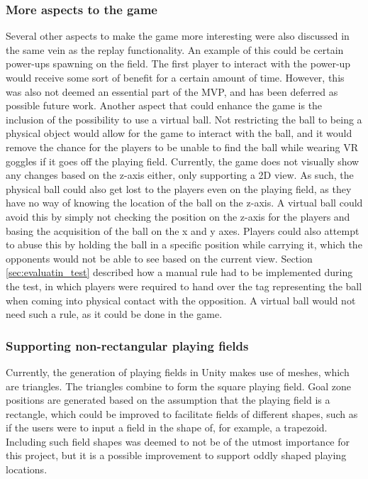 \subsubsection{More aspects to the game}
Several other aspects to make the game more interesting were also discussed in the same vein as the replay functionality.
An example of this could be certain power-ups spawning on the field.
The first player to interact with the power-up would receive some sort of benefit for a certain amount of time.
However, this was also not deemed an essential part of the MVP, and has been deferred as possible future work.
Another aspect that could enhance the game is the inclusion of the possibility to use a virtual ball.
Not restricting the ball to being a physical object would allow for the game to interact with the ball, and it would remove the chance for the players to be unable to find the ball while wearing VR goggles if it goes off the playing field.
Currently, the game does not visually show any changes based on the z-axis either, only supporting a 2D view.
As such, the physical ball could also get lost to the players even on the playing field, as they have no way of knowing the location of the ball on the z-axis.
A virtual ball could avoid this by simply not checking the position on the z-axis for the players and basing the acquisition of the ball on the x and y axes.
Players could also attempt to abuse this by holding the ball in a specific position while carrying it, which the opponents would not be able to see based on the current view.
Section \ref{sec:evaluatin_test} described how a manual rule had to be implemented during the test, in which players were required to hand over the tag representing the ball when coming into physical contact with the opposition.
A virtual ball would not need such a rule, as it could be done in the game.

\subsubsection{Supporting non-rectangular playing fields}
Currently, the generation of playing fields in Unity makes use of meshes, which are triangles.
The triangles combine to form the square playing field.
Goal zone positions are generated based on the assumption that the playing field is a rectangle, which could be improved to facilitate fields of different shapes, such as if the users were to input a field in the shape of, for example, a trapezoid.
Including such field shapes was deemed to not be of the utmost importance for this project, but it is a possible improvement to support oddly shaped playing locations.

